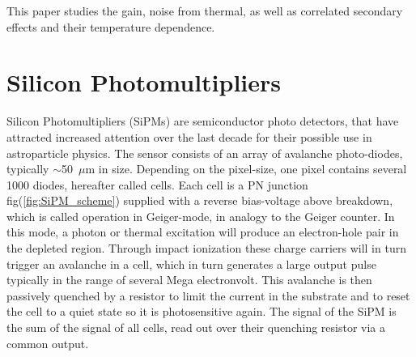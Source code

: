 \documentclass[12pt,article,type=msc,colorback,accentcolor=tud9c]{tudthesis}
\begin{document}
This paper studies the gain, noise from thermal, as well as correlated secondary effects and their temperature dependence. 





\clearpage
\section{\Large Silicon Photomultipliers}
\label{sec:SiPM}

\begin{figure}[h]
\begin{centering}
}
\caption{The size of the photodetector still used in progenitor IACT experiments (PMT)(left) compared to an SiPM(right). Picture from \cite{RWTHMaster1}}
\label{fig:PMT_SiPM_Size}
\end{centering}
\end{figure}

Silicon Photomultipliers (SiPMs) are semiconductor photo detectors, that have attracted increased attention over the last decade for their possible use in astroparticle physics. The sensor consists of an array of avalanche photo-diodes, typically $\sim$50~$\mu$m in size. Depending on the pixel-size, one pixel contains several 1000 diodes, hereafter called cells. Each cell is a PN junction fig(\ref{fig:SiPM_scheme}) supplied with a reverse bias-voltage above breakdown, which is called operation in Geiger-mode, in analogy to the Geiger counter. In this mode, a photon or thermal excitation will produce an electron-hole pair in the depleted region. Through impact ionization these charge carriers will in turn trigger an avalanche in a cell, which in turn generates a large output pulse typically in the range of several Mega electronvolt. This avalanche is then passively quenched by a resistor to limit the current in the substrate and to reset the cell to a quiet state so it is photosensitive again. The signal of the SiPM is the sum of the signal of all cells, read out over their quenching resistor via a common output.\\
\end{document}
